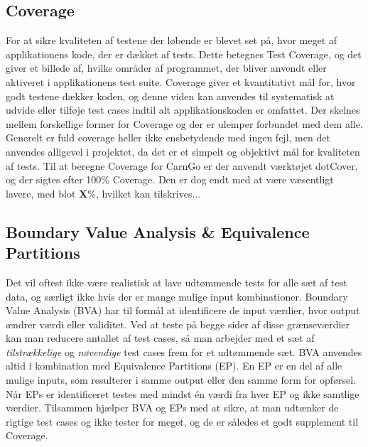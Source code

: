 \documentclass[Rapport/Rapport_main.tex]{subfiles}
\begin{document}
\subsection{Coverage}
For at sikre kvaliteten af testene der løbende er blevet set på, hvor meget af applikationens kode, der er dækket af tests. Dette betegnes Test Coverage, og det giver et billede af, hvilke områder af programmet, der bliver anvendt eller aktiveret i applikationens test suite. Coverage giver et kvantitativt mål for, hvor godt testene dækker koden, og denne viden kan anvendes til systematisk at udvide eller tilføje test cases indtil alt applikationskoden er omfattet. Der skelnes mellem forskellige former for Coverage og der er ulemper forbundet med dem alle. Generelt er fuld coverage heller ikke ensbetydende med ingen fejl, men det anvendes alligevel i projektet, da det er et simpelt og objektivt mål for kvaliteten af tests. Til at beregne Coverage for CarnGo er der anvendt værktøjet dotCover, og der sigtes efter 100\% Coverage. Den er dog endt med at være væsentligt lavere, med blot \textbf{X}\%, hvilket kan tilskrives...

\subsection{Boundary Value Analysis \& Equivalence Partitions}
Det vil oftest ikke være realistisk at lave udtømmende tests for alle sæt af test data, og særligt ikke hvis der er mange mulige input kombinationer. Boundary Value Analysis (BVA) har til formål at identificere de input værdier, hvor output ændrer værdi eller validitet. Ved at teste på begge sider af disse grænseværdier kan man reducere antallet af test cases, så man arbejder med et sæt af \textit{tilstrækkelige} og \textit{nøvendige} test cases frem for et udtømmende sæt. BVA anvendes altid i kombination med Equivalence Partitions (EP). En EP er en del af alle mulige inputs, som resulterer i samme output eller den samme form for opførsel. Når EPs er identificeret testes med mindst én værdi fra hver EP og ikke samtlige værdier. Tilsammen hjælper BVA og EPs med at sikre, at man udtænker de rigtige test cases og ikke tester for meget, og de er således et godt supplement til Coverage.
\end{document}

